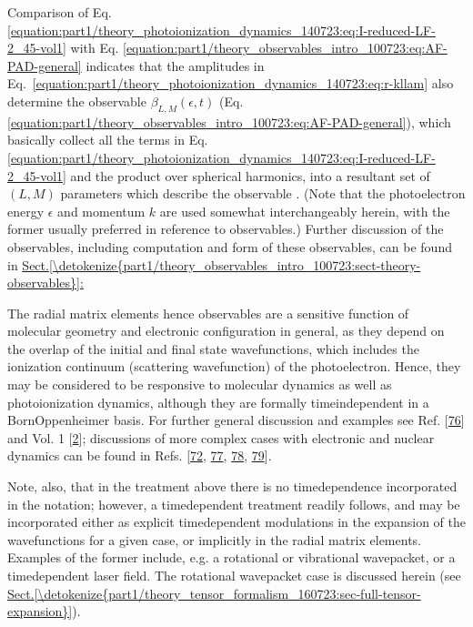 \documentclass[letterpaper,table,10pt,english]{jupyterBook}
\begin{document}
\sphinxAtStartPar
Comparison of Eq. \eqref{equation:part1/theory_photoionization_dynamics_140723:eq:I-reduced-LF-2_45-vol1} with Eq. \eqref{equation:part1/theory_observables_intro_100723:eq:AF-PAD-general} indicates that the amplitudes
in Eq. \eqref{equation:part1/theory_photoionization_dynamics_140723:eq:r-kllam} also determine the observable {\hyperref[\detokenize{backmatter/glossary:term-anisotropy-paramters}]{}} \(\beta_{L,M}(\epsilon,t)\) (Eq.
\eqref{equation:part1/theory_observables_intro_100723:eq:AF-PAD-general}), which basically collect all the terms in Eq. \eqref{equation:part1/theory_photoionization_dynamics_140723:eq:I-reduced-LF-2_45-vol1} and the product over spherical harmonics, into a resultant set of \((L,M)\) parameters which describe the observable {\hyperref[\detokenize{backmatter/glossary:term-PADs}]{}}. (Note that the photoelectron energy
\(\epsilon\) and momentum \(k\) are used somewhat interchangeably herein,
with the former usually preferred in reference to observables.) Further discussion of the observables, including computation and form of these observables, can be found in \hyperref[\detokenize{part1/theory_observables_intro_100723:sect-theory-observables}]{Sect.\@ \ref{\detokenize{part1/theory_observables_intro_100723:sect-theory-observables}}:}

\sphinxAtStartPar
The radial matrix elements \sphinxhyphen{} hence observables \sphinxhyphen{} are
a sensitive function of molecular geometry and electronic configuration
in general, as they depend on the overlap of the initial and final state wavefunctions, which includes the ionization continuum (scattering wavefunction) of the photoelectron.
Hence, they may be considered to be responsive to molecular
dynamics as well as photoionization dynamics, although they are formally time\sphinxhyphen{}independent in a
Born\sphinxhyphen{}Oppenheimer basis. For further general discussion and examples see
Ref. {[}\hyperlink{cite.backmatter/bibliography:id952}{76}{]} and  Vol. 1 {[}\hyperlink{cite.backmatter/bibliography:id663}{2}{]}; discussions of more
complex cases with electronic and nuclear dynamics can be found in Refs.
{[}\hyperlink{cite.backmatter/bibliography:id863}{72}, \hyperlink{cite.backmatter/bibliography:id502}{77}, \hyperlink{cite.backmatter/bibliography:id889}{78}, \hyperlink{cite.backmatter/bibliography:id886}{79}{]}.

\sphinxAtStartPar
Note, also, that in the treatment above there is no time\sphinxhyphen{}dependence
incorporated in the notation; however, a time\sphinxhyphen{}dependent treatment
readily follows, and may be incorporated either as explicit
time\sphinxhyphen{}dependent modulations in the expansion of the wavefunctions for a
given case, or implicitly in the radial matrix elements. Examples of the
former include, e.g. a rotational or vibrational wavepacket, or a
time\sphinxhyphen{}dependent laser field. The rotational wavepacket case is discussed
herein (see \hyperref[\detokenize{part1/theory_tensor_formalism_160723:sec-full-tensor-expansion}]{Sect.\@ \ref{\detokenize{part1/theory_tensor_formalism_160723:sec-full-tensor-expansion}}}).
\end{document}
